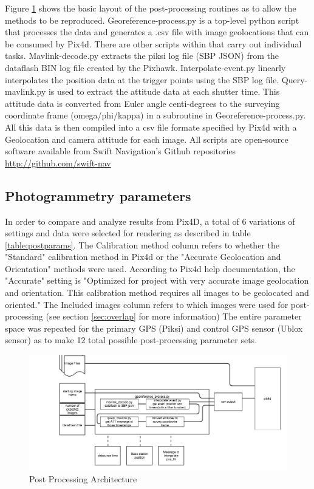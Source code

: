 \documentclass{article}
\begin{document}
Figure \ref{postprocess} shows the basic layout of the post-processing routines as to allow the 
methods to be reproduced.  Georeference-process.py is a top-level python script that processes the 
data and generates a .csv file with image geolocations that can be consumed by Pix4d. There are 
other scripts within that carry out individual tasks. Mavlink-decode.py extracts the piksi log file 
(SBP JSON) from the dataflash BIN log file created by the Pixhawk. Interpolate-event.py linearly 
interpolates the position data at the trigger points using the SBP log file. Query-mavlink.py is 
used to extract the attitude data at each shutter time. This attitude data is converted from Euler 
angle centi-degrees to the surveying coordinate frame (omega/phi/kappa) in a subroutine in 
Georeference-process.py. All this data is then compiled into a csv file formate specified by Pix4d 
with a Geolocation and camera attitude for each image.  All scripts are open-source software 
available from Swift Navigation's Github repositories \url{http://github.com/swift-nav}
\subsection{Photogrammetry parameters}
In order to compare and analyze results from Pix4D, a total of 6 variations of settings and data 
were selected for rendering as described in table \ref{table:postparams}.  The Calibration method 
column refers to whether the "Standard" calibration method in Pix4d or the "Accurate Geolocation 
and Orientation" methods were used.  According to Pix4d help documentation, the "Accurate" setting 
is "Optimized for project with very accurate image geolocation and orientation. This calibration 
method requires all images to be geolocated and oriented."\cite{pix4d_support1}  The Included 
images column refers to which images were used for post-processing (see section \ref{sec:overlap} 
for more information)
The entire parameter space was repeated for the primary GPS (Piksi) and control GPS sensor (Ublox 
sensor) as to make 12 total possible post-processing parameter sets.


\begin{figure}
\includegraphics[width=7in]{images/flow_charts/uav_survey_processing_architecture.png}
\caption{Post Processing Architecture}
\label{postprocess}
\end{figure}
\end{document}
